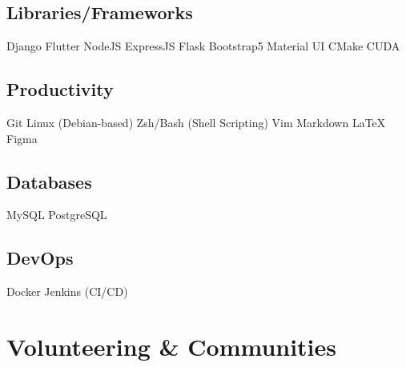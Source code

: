 \documentclass[]{openfont}
\begin{document}
\begin{minipage}[t]{0.33\textwidth}
    \subsection{Libraries/Frameworks}
    Django \textbullet{} Flutter \textbullet{} NodeJS \textbullet{} ExpressJS \textbullet{} Flask \textbullet{} Bootstrap5 \textbullet{} Material UI \textbullet{} CMake \textbullet{} CUDA
    \sectionsep

    \subsection{Productivity}
    Git \textbullet{} Linux (Debian-based) \textbullet{} Zsh/Bash (Shell Scripting) \textbullet{} Vim \textbullet{} Markdown \textbullet{} LaTeX \textbullet{} Figma
    \sectionsep

    \subsection{Databases}
    MySQL \textbullet{} PostgreSQL
    \sectionsep

    \subsection{DevOps}
    Docker \textbullet{} Jenkins (CI/CD)
    \sectionsep

    \section{Volunteering \& Communities}
    \textbullet{} 

    \textbullet{} 

    \textbullet{} 


\end{minipage}
\hfill
\end{document}
